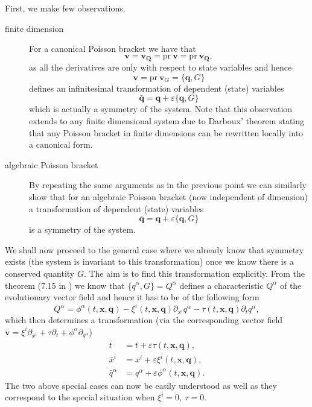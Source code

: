 \documentclass[
10pt, %
a4paper, %
oneside, %
headinclude,footinclude, %
BCOR5mm, %
]{scrartcl}
\newcommand{\xx}{\mathbf{x}}
\newcommand{\vv}{\mathbf{v}}
\newcommand{\qq}{\mathbf{q}}
\newcommand{\QQ}{\mathbf{Q}}
\newcommand{\IP}[1]{{\color{Red}IP:\ \ #1}}
\newcommand{\Gfunc}{G}
\begin{document}
First, we make few observations. 
\begin{description}
    \item[finite dimension] For a canonical Poisson bracket we have that 
    $$\vv=\vv_\QQ = \mathrm{pr}~ \vv = \mathrm{pr}~ \vv_\QQ,$$ as all the 
    derivatives are only with respect to state variables and hence 
    $$\vv=\mathrm{pr}~\vv_\Gfunc = \{\mathbf{\qq},\Gfunc\}$$ defines an 
    infinitesimal transformation of dependent (state) variables 
    $$\mathbf{\bar{\qq}} = \mathbf{\qq} + \varepsilon \{\mathbf{\qq},\Gfunc\}$$
    which is actually a symmetry of the system. Note that this observation extends to any finite dimensional system due to Darboux' theorem stating that any Poisson bracket in finite dimensions can be rewritten locally into a canonical form.
    \item[algebraic Poisson bracket] By repeating the same arguments as in the 
    previous point we can similarly show that for an algebraic Poisson bracket 
    (now independent of dimension) a transformation of dependent (state) 
    variables $$\mathbf{\bar{\qq}} = \mathbf{\qq} + \varepsilon 
    \{\mathbf{\qq},\Gfunc\}$$
    is a symmetry of the system.
\end{description}

We shall now proceed to the general case where we already know that symmetry 
exists (the system is invariant to this transformation) once we know there is a 
conserved quantity $\Gfunc$. The aim is to find this transformation explicitly. 
From the theorem 
(7.15 in \cite{olver2000applications}) we know that 
$\{q^\alpha,\Gfunc\}=Q^\alpha$ defines a characteristic 
$Q^\alpha$ of the evolutionary vector field and hence it has to be of the 
following form 
\begin{equation}
	Q^\alpha = \phi^\alpha(t,\mathbf{x},\mathbf{q}) - \xi^i(t,\mathbf{x},\mathbf{q}) \partial_{x^i} q^\alpha - \tau(t,\mathbf{x},\mathbf{q}) \partial_t q^\alpha,
\end{equation}
which then determines a transformation (via the corresponding vector field $\vv = \xi^i \partial_{x^i} + \tau \partial_t + \phi^\alpha \partial_{q^\alpha}$)
\begin{subequations}\label{eq.Ol.trafo}
\begin{align}
    \bar{t}    &= t + \varepsilon \tau(t,\xx,\qq) ,\\
    \bar{x}^i  &= x^i + \varepsilon \xi^i(t,\xx,\qq),\\
    \bar{q}^\alpha  &= q^\alpha + \varepsilon \phi^\alpha(t,\xx,\qq).
\end{align}
\end{subequations}
The two above special cases can now be easily understood as well as they correspond to the special situation when $\xi^i=0,~\tau=0$. 
\end{document}
